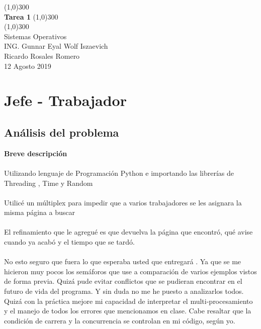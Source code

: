 \documentclass[a4paper, 12pt]{article}
\begin{document}
\begin{titlepage}
	\begin{center}
		\line(1,0){300} \\
		\huge{\bfseries Tarea 1 }
		\line(1,0){300} \\
		\line(1,0){300} \\
		Sistemas Operativos \\
		{\normalsize ING. Gunnar Eyal Wolf Iszaevich }\\
		{\normalsize Ricardo Rosales Romero }\\
		{\small 12 Agosto 2019}
	\end{center}
\end{titlepage}

\section {Jefe - Trabajador}

\subsection*{An\'alisis del problema}


{\bf  Breve descripción}\\ \\

Utilizando lenguaje de Programaci\'on Python e importando las librer\'ias de Threading , Time y Random 
\\ \\
Utilicé un m\'ultiplex para impedir que a varios trabajadores se les asignara la misma p\'agina a buscar
\\ \\
El refinamiento que le agregu\'e es que devuelva la p\'agina que encontr\'o, qu\'e avise cuando ya acab\'o y  el tiempo que se tard\'o.
\\ \\
No esto seguro  que fuera lo que esperaba usted que entregar\'a . Ya que se me hicieron muy pocos los sem\'aforos que use a comparaci\'on de varios ejemplos vistos de forma previa. Quiz\'a pude evitar conflictos que se pudieran encontrar en el futuro de vida del programa. Y sin duda no me he puesto a analizarlos todos. Quiz\'a con la pr\'actica mejore mi capacidad de interpretar  el multi-procesamiento y el manejo de todos los errores que mencionamos en clase. Cabe resaltar que la condici\'on de carrera y la concurrencia se controlan en mi c\'odigo, seg\'un yo. 
\\ \\
\end{document}
